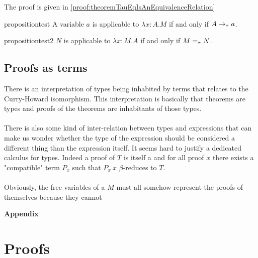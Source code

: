 The proof is given in \cref{proof:theoremTauEqIsAnEquivalenceRelation}

\begin{reusable}{proposition}{test}
    A variable $a$ is applicable to $\lambda x:A.M$ if and only if $A \to_{\tau} a$.
\end{reusable}

\begin{reusable}{proposition}{test2}
    $N$ is applicable to $\lambda x:M.A$ if and only if $M =_{\tau} N$.
\end{reusable}


\subsection{Proofs as terms}

There is an interpretation of types being inhabited by terms that relates to the Curry-Howard isomorphism. This interpretation is basically that theorems are types and proofs of the theorems are inhabitants of those types. \\
\\
There is also some kind of inter-relation between types and expressions that can make us wonder whether the type of the expression should be considered a different thing than the expression itself. It seems hard to justify a dedicated calculus for types. Indeed a proof of $T$ is itself a \lterm and for all proof $x$ there exists a "compatible" term $P_x$ such that $P_x\ x$ $\beta$-reduces to $T$.\\
\\
Obviously, the free variables of a \lterm $M$ must all somehow represent the proofs of themselves because they cannot 












\clearpage
\thispagestyle{empty} %

\vspace*{\fill} %
\begin{center}
    {\huge \textbf{Appendix}}
\end{center}
\vspace*{\fill} %

\clearpage
\appendix

\section{Proofs}

